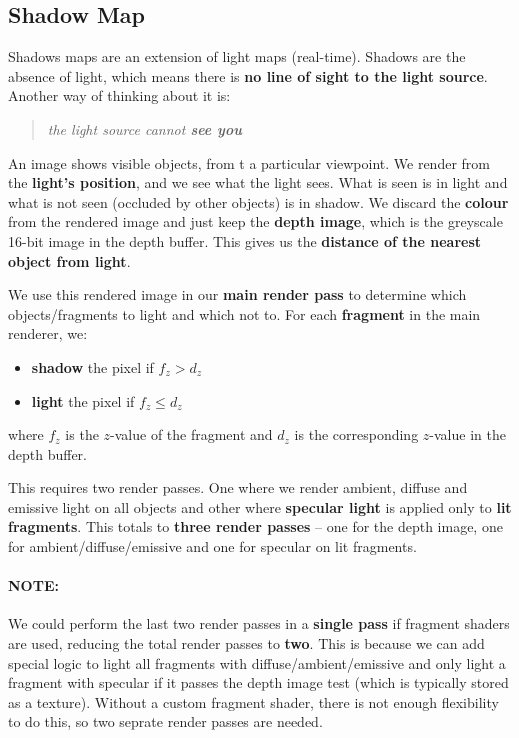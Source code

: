 \documentclass{article}
\begin{document}
\subsection{Shadow Map}

Shadows maps are an extension of light maps (real-time). Shadows are the absence of light, which means there is \textbf{no line of sight to the light source}. Another way of thinking about it is:
\begin{quote}
	\textit{the light source cannot \textbf{see you}}
\end{quote}

An image shows visible objects, from t a particular viewpoint. We render from the \textbf{light's position}, and we see what the light sees. What is seen is in light and what is not seen (occluded by other objects) is in shadow. We discard the \textbf{colour} from the rendered image and just keep the \textbf{depth image}, which is the greyscale 16-bit image in the depth buffer. This gives us the \textbf{distance of the nearest object from light}.

We use this rendered image in our \textbf{main render pass} to determine which objects/fragments to light and which not to. For each \textbf{fragment} in the main renderer, we:
\begin{itemize}
	\item \textbf{shadow} the pixel if $f_z > d_z$
	\item \textbf{light} the pixel if $f_z \leq d_z$
\end{itemize}
where $f_z$ is the $z$-value of the fragment and $d_z$ is the corresponding $z$-value in the depth buffer.

This requires two render passes. One where we render ambient, diffuse and emissive light on all objects and other where \textbf{specular light} is applied only to \textbf{lit fragments}. This totals to \textbf{three render passes} -- one for the depth image, one for ambient/diffuse/emissive and one for specular on lit fragments.

\paragraph{\textbf{NOTE: }} We could perform the last two render passes in a \textbf{single pass} if fragment shaders are used, reducing the total render passes to \textbf{two}. This is because we can add special logic to light all fragments with diffuse/ambient/emissive and only light a fragment with specular if it passes the depth image test (which is typically stored as a texture). Without a custom fragment shader, there is not enough flexibility to do this, so two seprate render passes are needed.
\end{document}
